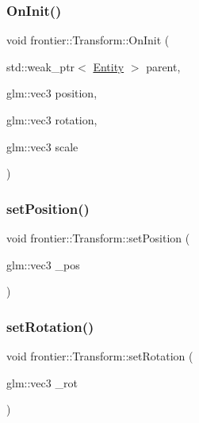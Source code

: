 \subsubsection{\texorpdfstring{On\+Init()}{OnInit()}\hspace{0.1cm}{\footnotesize\ttfamily [4/4]}}
{\footnotesize\ttfamily void frontier\+::\+Transform\+::\+On\+Init (\begin{DoxyParamCaption}\item[{std\+::weak\+\_\+ptr$<$ \hyperlink{classfrontier_1_1_entity}{Entity} $>$}]{parent,  }\item[{glm\+::vec3}]{position,  }\item[{glm\+::vec3}]{rotation,  }\item[{glm\+::vec3}]{scale }\end{DoxyParamCaption})}

\mbox{\label{classfrontier_1_1_transform_a39431f1267fe227a247f686787682aed}} 
\subsubsection{\texorpdfstring{set\+Position()}{setPosition()}}
{\footnotesize\ttfamily void frontier\+::\+Transform\+::set\+Position (\begin{DoxyParamCaption}\item[{glm\+::vec3}]{\+\_\+pos }\end{DoxyParamCaption})}

\mbox{\label{classfrontier_1_1_transform_a374a31649e6970b984495a287e473cbc}} 
\subsubsection{\texorpdfstring{set\+Rotation()}{setRotation()}}
{\footnotesize\ttfamily void frontier\+::\+Transform\+::set\+Rotation (\begin{DoxyParamCaption}\item[{glm\+::vec3}]{\+\_\+rot }\end{DoxyParamCaption})}

